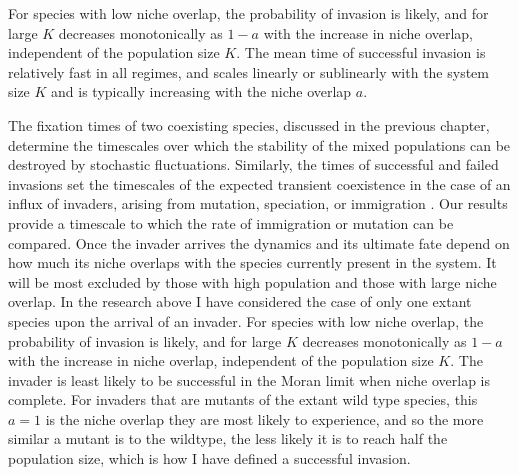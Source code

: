 For species with low niche overlap, the probability of invasion is likely, and for large $K$ decreases monotonically as $1-a$ with the increase in niche overlap, independent of the population size $K$. 
The mean time of successful invasion is relatively fast in all regimes, and scales linearly or sublinearly with the system size $K$ and is typically increasing with the niche overlap $a$.


The fixation times of two coexisting species, discussed in the previous chapter, determine the timescales over which the stability of the mixed populations can be destroyed by stochastic fluctuations. 
Similarly, the times of successful and failed invasions set the timescales of the expected transient coexistence in the case of an influx of invaders, arising from mutation, speciation, or immigration \cite{Hubbell2001,Desai2007,Carroll2015}. 
Our results provide a timescale to which the rate of immigration or mutation can be compared. 
\iffalse
Once the invader arrives the dynamics and its ultimate fate depend on how much its niche overlaps with the species currently present in the system. 
It will be most excluded by those with high population and those with large niche overlap. 
In the research above I have considered the case of only one extant species upon the arrival of an invader. 
For species with low niche overlap, the probability of invasion is likely, and for large $K$ decreases monotonically as $1-a$ with the increase in niche overlap, independent of the population size $K$. %
The invader is least likely to be successful in the Moran limit when niche overlap is complete. 
For invaders that are mutants of the extant wild type species, this $a=1$ is the niche overlap they are most likely to experience, and so the more similar a mutant is to the wildtype, the less likely it is to reach half the population size, which is how I have defined a successful invasion. 

